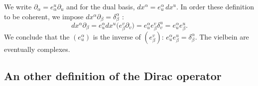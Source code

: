 We write $\partial_{\alpha}=e_{\alpha}^u\partial_u$ and for the dual basis, $dx^{\alpha}=e^{\alpha}_u\,dx^u$. In order these definition to be coherent, we impose $dx^{\alpha}\partial_{\beta}=\delta^{\alpha}_{\beta}$ :
\begin{equation}
  dx^{\alpha}\partial_{\beta}=e_u^{\alpha}dx^u\big( e^v_{\beta}\partial_v \big)
		=e^{\alpha}_ue^v_{\beta}\delta^u_v
		=e^{\alpha}_ue^u_{\beta}.
\end{equation}
We conclude that the  $(e^{\alpha}_u)$ is the inverse of $(e^v_{\beta})$: $e^{\alpha}_ue^u_{\beta}=\delta^{\alpha}_{\beta}$. The vielbein are eventually complexes.



\subsection{An other definition of the Dirac operator}

